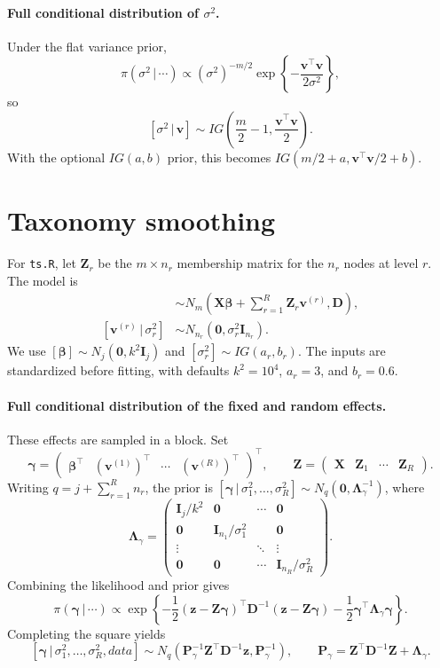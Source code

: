 \documentclass[11pt]{article}
\newcommand{\bb}[1]{\boldsymbol{#1}}
\newcommand{\given}{\,|\,}
\begin{document}
\paragraph{Full conditional distribution of $\sigma^2$.}
Under the flat variance prior,
\[
 \pi(\sigma^2\given\cdots)\propto
 (\sigma^2)^{-m/2}\exp\left\{-\frac{\bb v^\top\bb v}{2\sigma^2}\right\},
\]
so
\[
 [\sigma^2\given\bb v]\sim
 IG\left(\frac m2-1,\frac{\bb v^\top\bb v}{2}\right).
\]
With the optional $IG(a,b)$ prior, this becomes $IG(m/2+a,\bb v^\top\bb v/2+b)$.

\section*{Taxonomy smoothing}
For \texttt{ts.R}, let $\bb Z_r$ be the $m\times n_r$ membership matrix for the $n_r$ nodes at level $r$.
The model is
\begin{align*}
 [\bb z\given\bb\beta,\bb v^{(1)},\ldots,\bb v^{(R)}]
 &\sim N_m\left(\bb X\bb\beta+\sum_{r=1}^R\bb Z_r\bb v^{(r)},\bb D\right),\\
 [\bb v^{(r)}\given\sigma_r^2]
 &\sim N_{n_r}(\bb 0,\sigma_r^2\bb I_{n_r}).
\end{align*}
We use $[\bb\beta]\sim N_j(\bb 0,k^2\bb I_j)$ and $[\sigma_r^2]\sim IG(a_r,b_r)$.
The inputs are standardized before fitting, with defaults $k^2=10^4$, $a_r=3$, and $b_r=0.6$.

\paragraph{Full conditional distribution of the fixed and random effects.}
These effects are sampled in a block.
Set
\[
 \bb\gamma=\begin{pmatrix}\bb\beta^\top & (\bb v^{(1)})^\top & \cdots & (\bb v^{(R)})^\top\end{pmatrix}^\top,
 \qquad \bb Z=\begin{pmatrix}\bb X & \bb Z_1 & \cdots & \bb Z_R\end{pmatrix}.
\]
Writing $q=j+\sum_{r=1}^R n_r$, the prior is $[\bb\gamma\given\sigma_1^2,\ldots,\sigma_R^2]\sim N_q(\bb 0,\bb\Lambda_\gamma^{-1})$, where
\[
 \bb\Lambda_\gamma=
 \begin{pmatrix}
  \bb I_j/k^2 & \bb 0 & \cdots & \bb 0\\
  \bb 0 & \bb I_{n_1}/\sigma_1^2 & & \bb 0\\
  \vdots & & \ddots & \vdots\\
  \bb 0 & \bb 0 & \cdots & \bb I_{n_R}/\sigma_R^2
 \end{pmatrix}.
\]
Combining the likelihood and prior gives
\[
 \pi(\bb\gamma\given\cdots)\propto
 \exp\left\{-\frac12(\bb z-\bb Z\bb\gamma)^\top\bb D^{-1}(\bb z-\bb Z\bb\gamma)
             -\frac12\bb\gamma^\top\bb\Lambda_\gamma\bb\gamma\right\}.
\]
Completing the square yields
\[
 [\bb\gamma\given\sigma_1^2,\ldots,\sigma_R^2,data]\sim
 N_q\left(\bb P_\gamma^{-1}\bb Z^\top\bb D^{-1}\bb z,\bb P_\gamma^{-1}\right),
 \qquad \bb P_\gamma=\bb Z^\top\bb D^{-1}\bb Z+\bb\Lambda_\gamma.
\]
\end{document}
